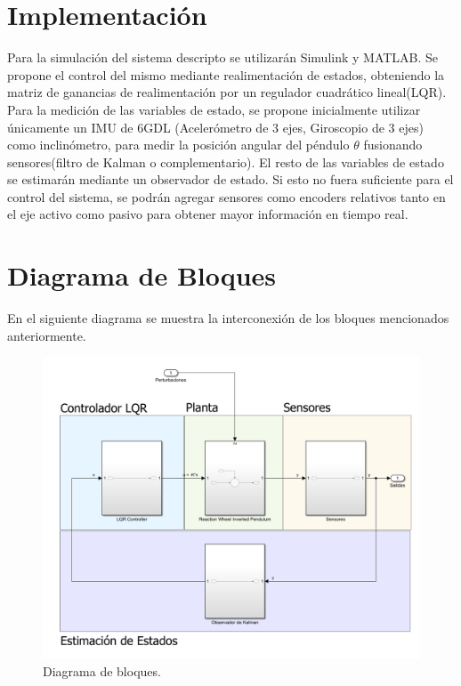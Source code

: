 \documentclass{article}
\begin{document}
\section{Implementación}
Para la simulación del sistema descripto se utilizarán Simulink y MATLAB. Se propone el control del mismo mediante realimentación
de estados, obteniendo la matriz de ganancias de realimentación por un regulador cuadrático lineal(LQR).
\newline
Para la medición de las variables de estado, se propone inicialmente utilizar únicamente un
IMU de 6GDL (Acelerómetro de 3 ejes, Giroscopio de 3 ejes) como inclinómetro, para medir la posición angular del péndulo 
$\theta$ fusionando sensores(filtro de Kalman o complementario). El resto de las variables de estado se estimarán mediante un observador de estado. Si esto no fuera 
suficiente para el control del sistema, se podrán agregar sensores como encoders relativos tanto en el eje activo como pasivo para
obtener mayor información en tiempo real.
\pagebreak
\section{Diagrama de Bloques}
En el siguiente diagrama se muestra la interconexión de los bloques mencionados anteriormente.
\begin{figure}[h!]
    \includegraphics[width=\linewidth]{images/block_diagram.png}
    \caption{Diagrama de bloques.}
    \label{fig:esquema2}
\end{figure}
    
\end{document}
